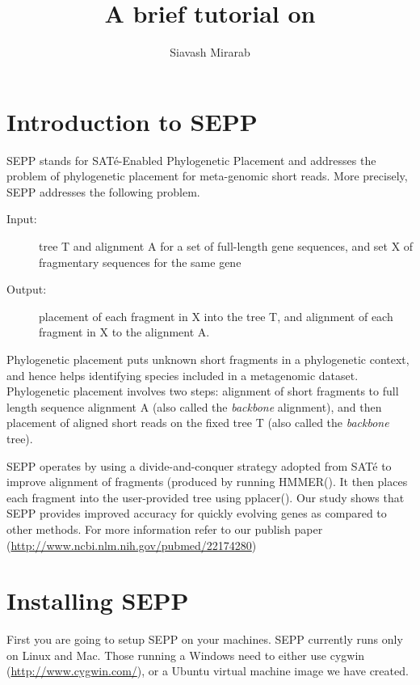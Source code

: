 \documentclass[11pt]{article} %
\title{A brief tutorial on \sepp }
\author{Siavash Mirarab}
\newcommand{\sepp}{SEPP\xspace}
\newcommand{\sate}{SAT\'{e}\xspace}
\newcommand{\pplacer}{pplacer\xspace}
\newcommand{\hmmer}{HMMER\xspace}
\begin{document}
\maketitle
\tableofcontents
\section{Introduction to \sepp}
\sepp stands for \sate-Enabled Phylogenetic Placement and addresses the problem of phylogenetic placement for meta-genomic short reads. More precisely, \sepp addresses the following problem.

\begin{description}
\item [Input:] tree T and alignment A for a set of full-length gene sequences, and set X of fragmentary sequences for the same gene

\item [Output:] placement of each fragment in X into the tree T, and alignment of each fragment in X to the alignment A.

\end{description}

Phylogenetic placement puts unknown short fragments in a phylogenetic context, and hence helps identifying species included in a metagenomic dataset.  
Phylogenetic placement involves two steps: alignment of short fragments to full length sequence alignment A (also called the {\em backbone} alignment), and then placement of aligned short reads on the fixed tree T (also called the {\em backbone} tree). 

\sepp operates by using a divide-and-conquer strategy adopted from \sate \cite{liu09science} to improve alignment of fragments (produced by running \hmmer (\cite{hmmer}). It then places each fragment into the user-provided tree using \pplacer (\cite{pplacer}). Our study shows that \sepp provides improved accuracy for quickly evolving genes as compared to other methods. For more information refer to our publish paper (\url{http://www.ncbi.nlm.nih.gov/pubmed/22174280})

\section{Installing \sepp}
First you are going to setup \sepp on your machines. \sepp currently runs only on Linux and Mac. Those running a Windows need to either use cygwin (\url{http://www.cygwin.com/}), or a Ubuntu virtual machine image we have created. 
 
\end{document}
